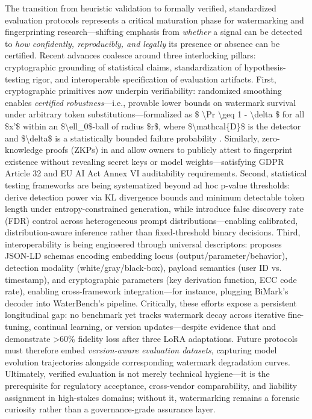 \documentclass[11pt,a4paper]{article}
\begin{document}
The transition from heuristic validation to formally verified, standardized evaluation protocols represents a critical maturation phase for watermarking and fingerprinting research---shifting emphasis from \emph{whether} a signal can be detected to \emph{how confidently, reproducibly, and legally} its presence or absence can be certified. Recent advances coalesce around three interlocking pillars: cryptographic grounding of statistical claims, standardization of hypothesis-testing rigor, and interoperable specification of evaluation artifacts. First, cryptographic primitives now underpin verifiability: randomized smoothing enables \emph{certified robustness}---i.e., provable lower bounds on watermark survival under arbitrary token substitutions---formalized as \$ \textbackslash{}Pr\cite{arxiv:2506.01011} \textbackslash{}geq 1 - \textbackslash{}delta \$ for all \$x'\$ within an \$\textbackslash{}ell\_0\$-ball of radius \$r\$, where \$\textbackslash{}mathcal\{D\}\$ is the detector and \$\textbackslash{}delta\$ is a statistically bounded failure probability \cite{arxiv:2401.16820}. Similarly, zero-knowledge proofs (ZKPs) in \cite{arxiv:2407.10887} and \cite{doi:10.1609/aaai.v37i12.26750} allow owners to publicly attest to fingerprint existence without revealing secret keys or model weights---satisfying GDPR Article 32 and EU AI Act Annex VI auditability requirements. Second, statistical testing frameworks are being systematized beyond ad hoc p-value thresholds: \cite{arxiv:2307.15593} derive detection power via KL divergence bounds and minimum detectable token length under entropy-constrained generation, while \cite{arxiv:2406.10281} introduce false discovery rate (FDR) control across heterogeneous prompt distributions---enabling calibrated, distribution-aware inference rather than fixed-threshold binary decisions. Third, interoperability is being engineered through universal descriptors: \cite{arxiv:2407.04411} proposes JSON-LD schemas encoding embedding locus (output/parameter/behavior), detection modality (white/gray/black-box), payload semantics (user ID vs. timestamp), and cryptographic parameters (key derivation function, ECC code rate), enabling cross-framework integration---for instance, plugging BiMark's \cite{arxiv:2403.04808} decoder into WaterBench's \cite{doi:10.1145/3691626} pipeline. Critically, these efforts expose a persistent longitudinal gap: no benchmark yet tracks watermark decay across iterative fine-tuning, continual learning, or version updates---despite evidence that \cite{arxiv:2410.06467} and \cite{doi:10.18653/v1/2023.acl-long.423} demonstrate >60\% fidelity loss after three LoRA adaptations. Future protocols must therefore embed \emph{version-aware evaluation datasets}, capturing model evolution trajectories alongside corresponding watermark degradation curves. Ultimately, verified evaluation is not merely technical hygiene---it is the prerequisite for regulatory acceptance, cross-vendor comparability, and liability assignment in high-stakes domains; without it, watermarking remains a forensic curiosity rather than a governance-grade assurance layer.
\end{document}
